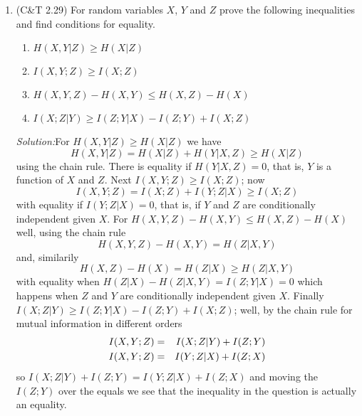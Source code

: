 \documentclass[12pt]{article}
\newcommand{\soln}{\noindent\textit{Solution:}}
\begin{document}
\begin{enumerate}
\soln Well
\begin{equation}
I(X;Y)=H(X)-H(X|Y)
\end{equation}
Here we use $X$ to denote the front of the dice and $Y$ the front. Obviously 
\begin{equation}
H(X)=\log{6}=1+\log{3}
\end{equation}
since all possibilities are equally likely and six is the number of possibilities. On the other hand, if the top has a given value, say one, the front has four equally likely values, so,
\begin{equation}
H(X|Y=1)=\log{4}=2
\end{equation}
and $H(X|Y)$ is the average of the $H(X|Y=y)$ values; since they are all equally likely
\begin{equation}
H(X|Y)=2
\end{equation}
so
\begin{equation}
I(X;Y)=H(X)-H(X|Y)=\log{3}-1.
\end{equation}

\item (C\&T 2.29) For random variables $X$, $Y$ and $Z$ prove the following inequalities and find conditions for equality.
\begin{enumerate}
\item $H(X,Y|Z)\ge H(X|Z)$
\item $I(X,Y;Z)\ge I(X;Z)$
\item $H(X,Y,Z)-H(X,Y)\le H(X,Z)-H(X)$
\item $I(X;Z|Y)\ge I(Z;Y|X)-I(Z;Y)+I(X;Z)$
\end{enumerate}


\soln For $H(X,Y|Z)\ge H(X|Z)$ we have
\begin{equation}
H(X,Y|Z)=H(X|Z)+H(Y|X,Z)\ge H(X|Z)
\end{equation}
using the chain rule. There is equality if $H(Y|X,Z)=0$, that is, $Y$ is a function of $X$ and $Z$. Next $I(X,Y;Z)\ge I(X;Z)$; now
\begin{equation}
I(X,Y;Z)=I(X;Z)+I(Y;Z|X)\ge I(X;Z)
\end{equation}
with equality if $I(Y;Z|X)=0$, that is, if $Y$ and $Z$ are conditionally
independent given $X$. For $H(X,Y,Z)-H(X,Y)\le H(X,Z)-H(X)$ well,
using the chain rule
\begin{equation}
H(X,Y,Z)-H(X,Y)=H(Z|X,Y)
\end{equation}
and, similarily 
\begin{equation}
H(X,Z)-H(X)=H(Z|X)\ge H(Z|X,Y)
\end{equation}
with equality when $H(Z|X)-H(Z|X,Y)=I(Z;Y|X)=0$ which happens when $Z$ and $Y$ are conditionally independent given $X$. Finally $I(X;Z|Y)\ge I(Z;Y|X)-I(Z;Y)+I(X;Z)$; well, by the chain rule for mutual information in different orders
\begin{eqnarray}
I(X,Y;Z)&=&I(X;Z|Y)+I(Z;Y)\cr
I(X,Y;Z)&=&I(Y;Z|X)+I(Z;X)
\end{eqnarray}
so $I(X;Z|Y)+I(Z;Y)=I(Y;Z|X)+I(Z;X)$ and moving the $I(Z;Y)$ over the equals we see that the inequality in the question is actually an equality.


\end{enumerate}
\end{document}
